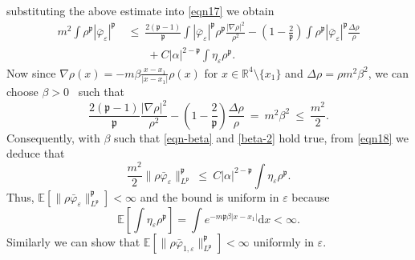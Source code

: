 \documentclass{article}
\newcommand{\mathd}{\mathrm{d}}
\begin{document}
substituting the above estimate into \eqref{eqn17} we obtain
%
\begin{align}\label{eqn18}
    m^2 \int \rho^{\mathfrak{p}} | \bar{\varphi}_{\varepsilon}
    |^{\mathfrak{p}} & ~ \leq ~ \frac{2 (\mathfrak{p}- 1)}{\mathfrak{p}}
    \int | \bar{\varphi}_{\varepsilon} |^{\mathfrak{p}} \rho^{\mathfrak{p}}
    \frac{| \nabla \rho |^2}{\rho^2} - \left( 1 - \frac{2}{\mathfrak{p}}
    \right) \int \rho^{\mathfrak{p}} | \bar{\varphi}_{\varepsilon}
    |^{\mathfrak{p}} \frac{\Delta \rho}{\rho} \nonumber\\
    & \qquad + C | \alpha |^{2 -\mathfrak{p}} \int \eta_{\varepsilon}
    \rho^{\mathfrak{p}} .
\end{align}
%
Now since $\nabla \rho (x) = - m \beta \frac{x - x_1}{| x - x_1 |} \rho (x)$
for $x \in \mathbb{R}^4 \setminus \{ x_1 \}$ and $\Delta \rho = \rho m^2
\beta^2$, we can choose $\beta > 0$ \ such that
%
\begin{equation}
    \frac{2 (\mathfrak{p}- 1)}{\mathfrak{p}} \frac{| \nabla \rho |^2}{\rho^2}
    - \left( 1 - \frac{2}{\mathfrak{p}} \right) \frac{\Delta \rho}{\rho} ~=~ m^2
    \beta^2 ~\leqslant~ \frac{m^2}{2} .
    \label{beta-2}
\end{equation}
%
Consequently, with $\beta$ such that \eqref{eqn-beta} and \eqref{beta-2} hold
true, from \eqref{eqn18} we deduce that
\begin{equation}
    \frac{m^2}{2} \| \rho \bar{\varphi}_{\varepsilon}
    \|_{L^{\mathfrak{p}}}^{\mathfrak{p}} ~\leqslant~ C | \alpha |^{2
    -\mathfrak{p}} \int \eta_{\varepsilon} \rho^{\mathfrak{p}} .
  \label{eqn19} 
\end{equation}
%
Thus, $\mathbb{E} \left[\| \rho \bar{\varphi}_{\varepsilon}
\|_{L^{\mathfrak{p}}}^{\mathfrak{p}} \right] < \infty$ and the bound is uniform in $\varepsilon$ because
%
\begin{equation}\label{eqn20} 
  \mathbb{E} \left[ \int \eta_{\varepsilon} \rho^{\mathfrak{p}} \right] = \int
  e^{- m\mathfrak{p} \beta | x - x_1 |} \mathd x < \infty . 
\end{equation}
%
Similarly we can show that $\mathbb{E} [\| \rho \bar{\varphi}_{1, \varepsilon}
\|_{L^{\mathfrak{p}}}^{\mathfrak{p}}] < \infty$ uniformly in $\varepsilon$.\\
\end{document}
